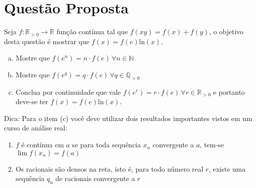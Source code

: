 \section{Questão Proposta}

Seja $f:\mathbb{R}_{>0} \to \mathbb{R}$ função contínua tal que $f(xy) = f(x) + f(y)$, o objetivo desta questão é mostrar que $f(x) = f(e)\text{ln}(x)$.
\begin{enumerate}[(a)]
    \item Mostre que $f(e^n) = n\cdot f(e) \, \forall n \in \mathbb{N}$
    \item Mostre que $f(e^q) = q\cdot f(e) \, \forall q \in \mathbb{Q}_{>0}$
    \item Conclua por continuidade que vale $f(e^r) = r\cdot f(e) \, \forall r \in \mathbb{R}_{>0}$ e portanto deve-se ter $f(x) = f(e) \text{ln}(x)$.
\end{enumerate}

Dica: Para o item (c) você deve utilizar dois resultados importantes vistos em um curso de análise real:
\begin{enumerate}
    \item $f$ é contínua em $a$ se para toda sequência $x_n$ convergente a $a$, tem-se $\lim f(x_n) = f(a)$
    \item Os racionais são densos na reta, isto é, para todo número real $r$, existe uma sequência $q_n$ de racionais convergente a $r$
\end{enumerate}

